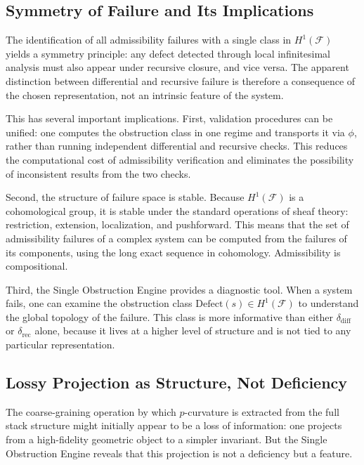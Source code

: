 \documentclass[12pt]{article}
\begin{document}
\subsection{Symmetry of Failure and Its Implications}

The identification of all admissibility failures with a single class in
$H^1(\mathcal{F})$ yields a symmetry principle: any defect detected through local
infinitesimal analysis must also appear under recursive closure, and vice versa. The
apparent distinction between differential and recursive failure is therefore a
consequence of the chosen representation, not an intrinsic feature of the system.

This has several important implications. First, validation procedures can be unified:
one computes the obstruction class in one regime and transports it via $\phi$, rather
than running independent differential and recursive checks. This reduces the
computational cost of admissibility verification and eliminates the possibility of
inconsistent results from the two checks.

Second, the structure of failure space is stable. Because $H^1(\mathcal{F})$ is a
cohomological group, it is stable under the standard operations of sheaf theory:
restriction, extension, localization, and pushforward. This means that the set of
admissibility failures of a complex system can be computed from the failures of its
components, using the long exact sequence in cohomology. Admissibility is compositional.

Third, the Single Obstruction Engine provides a diagnostic tool. When a system fails,
one can examine the obstruction class $\mathrm{Defect}(s) \in H^1(\mathcal{F})$ to
understand the global topology of the failure. This class is more informative than
either $\delta_{\mathrm{diff}}$ or $\delta_{\mathrm{rec}}$ alone, because it lives
at a higher level of structure and is not tied to any particular representation.

\subsection{Lossy Projection as Structure, Not Deficiency}

The coarse-graining operation by which $p$-curvature is extracted from the full stack
structure might initially appear to be a loss of information: one projects from a
high-fidelity geometric object to a simpler invariant. But the Single Obstruction
Engine reveals that this projection is not a deficiency but a feature.
\end{document}
